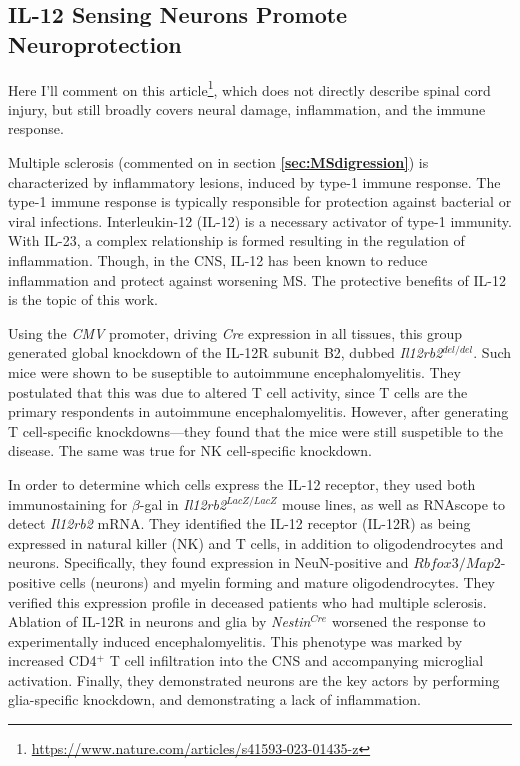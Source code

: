 \subsection{IL-12 Sensing Neurons Promote Neuroprotection}

Here I'll comment on this article\footnote{\url{https://www.nature.com/articles/s41593-023-01435-z}}, which does not directly describe spinal cord injury, but still broadly covers neural damage, inflammation, and the immune response.\newline

Multiple sclerosis (commented on in section \textbf{\ref{sec:MSdigression}}) is characterized by inflammatory lesions, induced by type-1 immune response. The type-1 immune response is typically responsible for protection against bacterial or viral infections. 
Interleukin-12 (IL-12) is a necessary activator of type-1 immunity. With IL-23, a complex relationship is formed resulting in the regulation of inflammation. Though, in the CNS, IL-12 has been known to reduce inflammation and protect against worsening MS. The protective benefits of IL-12 is the topic of this work.\newline

Using the \textit{CMV} promoter, driving \textit{Cre} expression in all tissues, this group generated global knockdown of the IL-12R subunit B2, dubbed \textit{Il12rb2}$^{del/del}$. Such mice were shown to be suseptible to autoimmune encephalomyelitis. They postulated that this was due to altered T cell activity, since T cells are the primary respondents in autoimmune encephalomyelitis. However, after generating T cell-specific knockdowns---they found that the mice were still suspetible to the disease. The same was true for NK cell-specific knockdown.\newline

In order to determine which cells express the IL-12 receptor, they used both immunostaining for $\beta$-gal in \textit{Il12rb2}$^{LacZ/LacZ}$ mouse lines, as well as RNAscope to detect \textit{Il12rb2} mRNA. They identified the IL-12 receptor (IL-12R) as being expressed in natural killer (NK) and T cells, in addition to oligodendrocytes and neurons. Specifically, they found expression in NeuN-positive and $Rbfox3/Map2$-positive cells (neurons) and myelin forming and mature oligodendrocytes. They verified this expression profile in deceased patients who had multiple sclerosis. Ablation of IL-12R in neurons and glia by \textit{Nestin}$^{Cre}$ worsened the response to experimentally induced encephalomyelitis. This phenotype was marked by increased CD4$^+$ T cell infiltration into the CNS and accompanying microglial activation. Finally, they demonstrated neurons are the key actors by performing glia-specific knockdown, and demonstrating a lack of inflammation. \newline

